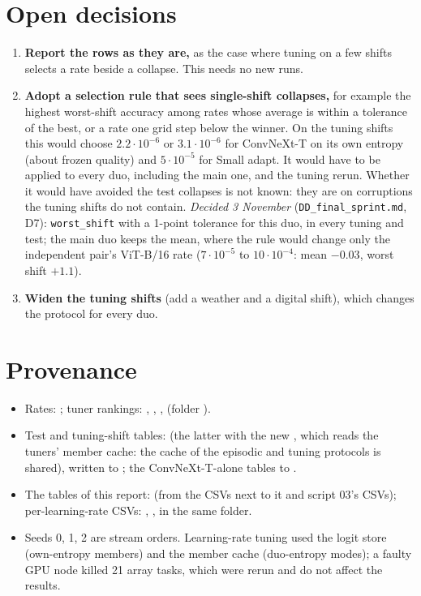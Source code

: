 \documentclass[10pt]{article}
\newcommand{\rl}[1]{\texttt{#1}}
\newcommand{\vit}{ViT-B/16}
\newcommand{\cnx}{ConvNeXt-T}
\newcommand{\lr}[2]{\(#1{\cdot}10^{#2}\)}
\begin{document}
\section{Open decisions}\label{sec:open}
\begin{enumerate}
  \item \textbf{Report the rows as they are,} as the case where tuning on a few shifts selects a rate beside a collapse. This needs no new runs.
  \item \textbf{Adopt a selection rule that sees single-shift collapses,} for example the highest worst-shift accuracy among rates whose average is within a tolerance of the best, or a rate one grid step below the winner. On the tuning shifts this would choose \(2.2{\cdot}10^{-6}\) or \(3.1{\cdot}10^{-6}\) for \cnx{} on its own entropy (about frozen quality) and \(5{\cdot}10^{-5}\) for Small adapt. It would have to be applied to every duo, including the main one, and the tuning rerun. Whether it would have avoided the test collapses is not known: they are on corruptions the tuning shifts do not contain. \emph{Decided 3 November} (\rl{DD\_final\_sprint.md}, D7): \rl{worst\_shift} with a 1-point tolerance for this duo, in every tuning and test; the main duo keeps the mean, where the rule would change only the independent pair's \vit{} rate (\lr{7}{-5} to \lr{10}{-4}: mean \(-0.03\), worst shift \(+1.1\)).
  \item \textbf{Widen the tuning shifts} (add a weather and a digital shift), which changes the protocol for every duo.
\end{enumerate}

\appendix
\section{Provenance}
\begin{itemize}
  \item Rates: ; tuner rankings: , , ,  (folder ).
  \item Test and tuning-shift tables:  (the latter with the new , which reads the tuners' member cache: the cache of the episodic and tuning protocols is shared), written to ; the \cnx{}-alone tables to .
  \item The tables of this report:  (from the CSVs next to it and script 03's CSVs); per-learning-rate CSVs: , ,  in the same folder.
  \item Seeds 0, 1, 2 are stream orders. Learning-rate tuning used the logit store (own-entropy members) and the member cache (duo-entropy modes); a faulty GPU node killed 21 array tasks, which were rerun and do not affect the results.
\end{itemize}
\end{document}
